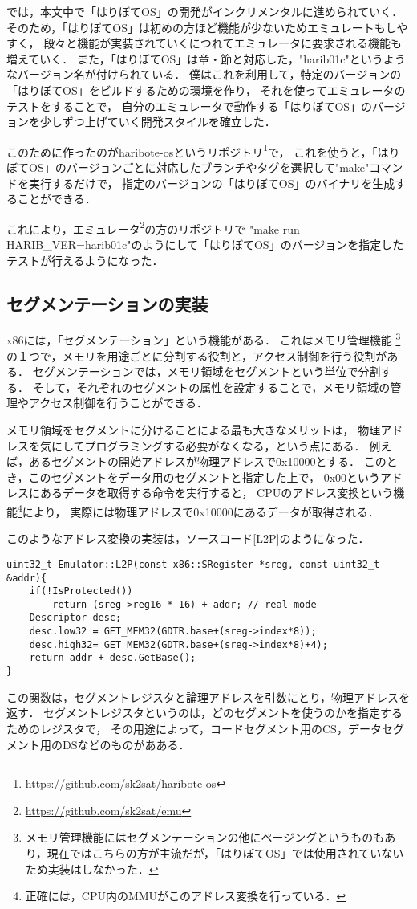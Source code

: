 \documentclass[10pt,a4j]{jsarticle}
\begin{document}
\cite{30days-osdev}では，本文中で「はりぼてOS」の開発がインクリメンタルに進められていく．
そのため，「はりぼてOS」は初めの方ほど機能が少ないためエミュレートもしやすく，
段々と機能が実装されていくにつれてエミュレータに要求される機能も増えていく．
また，「はりぼてOS」は章・節と対応した，"harib01c"というようなバージョン名が付けられている．
僕はこれを利用して，特定のバージョンの「はりぼてOS」をビルドするための環境を作り，
それを使ってエミュレータのテストをすることで，
自分のエミュレータで動作する「はりぼてOS」のバージョンを少しずつ上げていく開発スタイルを確立した．

このために作ったのがharibote-osというリポジトリ\footnote{\url{https://github.com/sk2sat/haribote-os}}で，
これを使うと，「はりぼてOS」のバージョンごとに対応したブランチやタグを選択して"make"コマンドを実行するだけで，
指定のバージョンの「はりぼてOS」のバイナリを生成することができる．

これにより，エミュレータ\footnote{\url{https://github.com/sk2sat/emu}}の方のリポジトリで
"make run HARIB\_VER=harib01c"のようにして「はりぼてOS」のバージョンを指定したテストが行えるようになった．

\subsection{セグメンテーションの実装\label{impl-segmentation}}
x86には，「セグメンテーション」という機能がある．
これはメモリ管理機能
\footnote{メモリ管理機能にはセグメンテーションの他にページングというものもあり，現在ではこちらの方が主流だが，「はりぼてOS」では使用されていないため実装はしなかった．}
の１つで，メモリを用途ごとに分割する役割と，アクセス制御を行う役割がある．
セグメンテーションでは，メモリ領域をセグメントという単位で分割する．
そして，それぞれのセグメントの属性を設定することで，メモリ領域の管理やアクセス制御を行うことができる．

メモリ領域をセグメントに分けることによる最も大きなメリットは，
物理アドレスを気にしてプログラミングする必要がなくなる，という点にある．
例えば，あるセグメントの開始アドレスが物理アドレスで0x10000とする．
このとき，このセグメントをデータ用のセグメントと指定した上で，
0x00というアドレスにあるデータを取得する命令を実行すると，
CPUのアドレス変換という機能\footnote{正確には，CPU内のMMUがこのアドレス変換を行っている．}により，
実際には物理アドレスで0x10000にあるデータが取得される．

このようなアドレス変換の実装は，ソースコード\ref{L2P}のようになった．
\begin{lstlisting}[caption=論理アドレスの物理アドレスへの変換,label=L2P]
uint32_t Emulator::L2P(const x86::SRegister *sreg, const uint32_t &addr){
	if(!IsProtected())
		return (sreg->reg16 * 16) + addr; // real mode
	Descriptor desc;
	desc.low32 = GET_MEM32(GDTR.base+(sreg->index*8));
	desc.high32= GET_MEM32(GDTR.base+(sreg->index*8)+4);
	return addr + desc.GetBase();
}
\end{lstlisting}
この関数は，セグメントレジスタと論理アドレスを引数にとり，物理アドレスを返す．
セグメントレジスタというのは，どのセグメントを使うのかを指定するためのレジスタで，
その用途によって，コードセグメント用のCS，データセグメント用のDSなどのものがあある．
\end{document}
